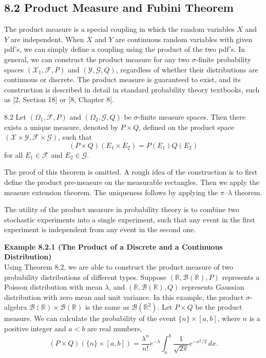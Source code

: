 \subsection*{8.2 Product Measure and Fubini Theorem}

The product measure is a special coupling in which the random variables $X$ and $Y$ are independent. When $X$ and $Y$ are continuous random variables with given pdf's, we can simply define a coupling using the product of the two pdf's. In general, we can construct the product measure for any two $\sigma$-finite probability spaces $(\mathcal{X}_1,\mathcal{F},P)$ and $(\mathcal{Y},\mathcal{G},Q)$, regardless of whether their distributions are continuous or discrete. The product measure is guaranteed to exist, and its construction is described in detail in standard probability theory textbooks, such as [2, Section 18] or [8, Chapter 8].

\begin{thmbox}{8.2}
Let $(\Omega_1,\mathcal{F},P)$ and $(\Omega_2,\mathcal{G},Q)$ be $\sigma$-finite measure spaces. Then there exists a unique measure, denoted by $P\times Q$, defined on the product space $(\mathcal{X}\times \mathcal{Y},\mathcal{F}\times \mathcal{G})$, such that
\[
(P\times Q)(E_1\times E_2)=P(E_1)Q(E_2)
\]
for all $E_1\in \mathcal{F}$ and $E_2\in \mathcal{G}$.
\end{thmbox}

The proof of this theorem is omitted. A rough idea of the construction is to first define the product pre-measure on the measurable rectangles. Then we apply the measure extension theorem. The uniqueness follows by applying the $\pi$--$\lambda$ theorem.

The utility of the product measure in probability theory is to combine two stochastic experiments into a single experiment, such that any event in the first experiment is independent from any event in the second one.

\textbf{Example 8.2.1 (The Product of a Discrete and a Continuous Distribution)} \\
Using Theorem 8.2, we are able to construct the product measure of two probability distributions of different types. Suppose $(\mathbb{R},\mathcal{B}(\mathbb{R}),P)$ represents a Poisson distribution with mean $\lambda$, and $(\mathbb{R},\mathcal{B}(\mathbb{R}),Q)$ represents Gaussian distribution with zero mean and unit variance. In this example, the product $\sigma$-algebra $\mathcal{B}(\mathbb{R})\times \mathcal{B}(\mathbb{R})$ is the same as $\mathcal{B}(\mathbb{R}^2)$. Let $P\times Q$ be the product measure. We can calculate the probability of the event $\{n\}\times [a,b]$, where $n$ is a positive integer and $a<b$ are real numbers,
\[
(P\times Q)(\{n\}\times [a,b])
=
\frac{\lambda^n}{n!}e^{-\lambda}
\int_a^b \frac{1}{\sqrt{2\pi}}e^{-x^2/2}\, dx.
\]

